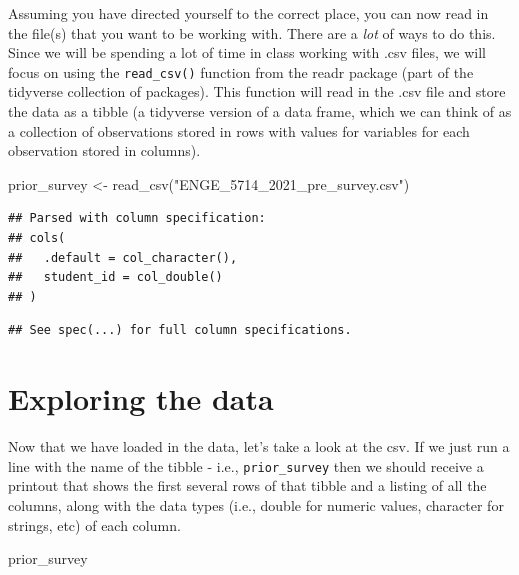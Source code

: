 \documentclass[
]{book}
\newenvironment{Shaded}{\begin{snugshade}}{\end{snugshade}}
\newcommand{\FunctionTok}[1]{\textcolor[rgb]{0.00,0.00,0.00}{#1}}
\newcommand{\NormalTok}[1]{#1}
\newcommand{\OtherTok}[1]{\textcolor[rgb]{0.56,0.35,0.01}{#1}}
\newcommand{\StringTok}[1]{\textcolor[rgb]{0.31,0.60,0.02}{#1}}
\begin{document}
Assuming you have directed yourself to the correct place, you can now read in the file(s) that you want to be working with. There are a \emph{lot} of ways to do this. Since we will be spending a lot of time in class working with .csv files, we will focus on using the \texttt{read\_csv()} function from the readr package (part of the tidyverse collection of packages). This function will read in the .csv file and store the data as a tibble (a tidyverse version of a data frame, which we can think of as a collection of observations stored in rows with values for variables for each observation stored in columns).

\begin{Shaded}
\begin{Highlighting}[]
\NormalTok{prior\_survey }\OtherTok{\textless{}{-}} \FunctionTok{read\_csv}\NormalTok{(}\StringTok{"ENGE\_5714\_2021\_pre\_survey.csv"}\NormalTok{)}
\end{Highlighting}
\end{Shaded}

\begin{verbatim}
## Parsed with column specification:
## cols(
##   .default = col_character(),
##   student_id = col_double()
## )
\end{verbatim}

\begin{verbatim}
## See spec(...) for full column specifications.
\end{verbatim}

\hypertarget{exploring-the-data}{%
\section{Exploring the data}\label{exploring-the-data}}

Now that we have loaded in the data, let's take a look at the csv. If we just run a line with the name of the tibble - i.e., \texttt{prior\_survey} then we should receive a printout that shows the first several rows of that tibble and a listing of all the columns, along with the data types (i.e., double for numeric values, character for strings, etc) of each column.

\begin{Shaded}
\begin{Highlighting}[]
\NormalTok{prior\_survey}
\end{Highlighting}
\end{Shaded}
\end{document}
